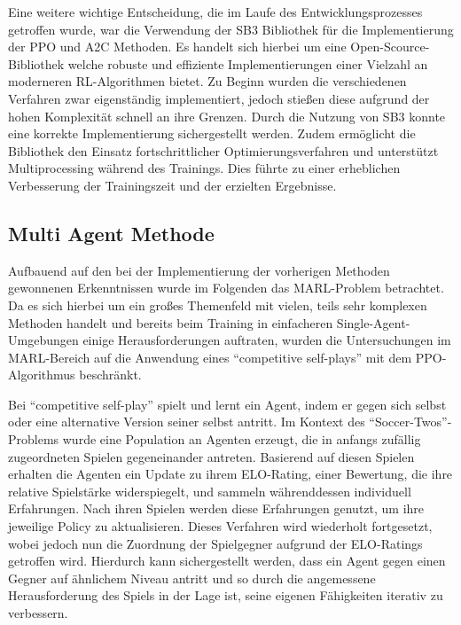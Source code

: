 \documentclass[twocolumn]{webofc}
\begin{document}
Eine weitere wichtige Entscheidung, die im Laufe des Entwicklungsprozesses getroffen wurde, war die Verwendung der \ac{SB3} Bibliothek \cite{stable-baselines3} für die Implementierung der \ac{PPO} und \ac{A2C} Methoden. Es handelt sich hierbei um eine Open-Scource-Bibliothek welche robuste und effiziente Implementierungen einer Vielzahl an moderneren \ac{RL}-Algorithmen bietet.
Zu Beginn wurden die verschiedenen Verfahren zwar eigenständig implementiert, jedoch stießen diese aufgrund der hohen Komplexität schnell an ihre Grenzen. Durch die Nutzung von \ac{SB3} konnte eine korrekte Implementierung sichergestellt werden. Zudem ermöglicht die Bibliothek den Einsatz fortschrittlicher Optimierungsverfahren und unterstützt Multiprocessing während des Trainings. Dies führte zu einer erheblichen Verbesserung der Trainingszeit und der erzielten Ergebnisse.

\subsection{Multi Agent Methode}

Aufbauend auf den bei der Implementierung der vorherigen Methoden gewonnenen Erkenntnissen wurde im Folgenden das \ac{MARL}-Problem betrachtet. Da es sich hierbei um ein großes Themenfeld mit vielen, teils sehr komplexen Methoden handelt und bereits beim Training in einfacheren Single-Agent-Umgebungen einige Herausforderungen auftraten, wurden die Untersuchungen im \ac{MARL}-Bereich auf die Anwendung eines \enquote{competitive self-plays} mit dem \ac{PPO}-Algorithmus beschränkt.

Bei \enquote{competitive self-play} spielt und lernt ein Agent, indem er gegen sich selbst oder eine alternative Version seiner selbst antritt. Im Kontext des \enquote{Soccer-Twos}-Problems wurde eine Population an Agenten erzeugt, die in anfangs zufällig zugeordneten Spielen gegeneinander antreten. Basierend auf diesen Spielen erhalten die Agenten ein Update zu ihrem ELO-Rating, einer Bewertung, die ihre relative Spielstärke widerspiegelt, und sammeln währenddessen individuell Erfahrungen. Nach ihren Spielen werden diese Erfahrungen genutzt, um ihre jeweilige Policy zu aktualisieren. Dieses Verfahren wird wiederholt fortgesetzt, wobei jedoch nun die Zuordnung der Spielgegner aufgrund der ELO-Ratings getroffen wird. Hierdurch kann sichergestellt werden, dass ein Agent gegen einen Gegner auf ähnlichem Niveau antritt und so durch die angemessene Herausforderung des Spiels in der Lage ist, seine eigenen Fähigkeiten iterativ zu verbessern.
\end{document}
